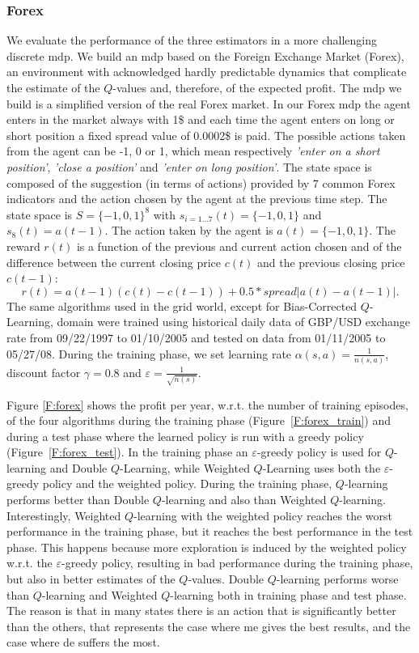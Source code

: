 \subsubsection{Forex}
We evaluate the performance of the three estimators in a more challenging discrete \gls{mdp}.
We build an \gls{mdp} based on the Foreign Exchange Market (Forex), an environment with acknowledged hardly predictable dynamics that complicate the estimate of the $Q$-values and, therefore, of the expected profit. The \gls{mdp} we build is a simplified version of the real Forex market. In our Forex \gls{mdp} the agent enters in the market always with 1\$ and each time the agent enters on long or short position a fixed spread value of 0.0002\$ is paid.
The possible actions taken from the agent can be -1, 0 or 1, which mean respectively \textit{'enter on a short position'}, \textit{'close a position'} and \textit{'enter on long position'}.
The state space is composed of the suggestion (in terms of actions) provided by 7 common Forex indicators and the action chosen by the agent at the previous time step.
The state space is $S = \lbrace -1, 0, 1 \rbrace ^8$ with $s_{i = 1...7}(t) = \lbrace -1, 0, 1 \rbrace$ and $s_8(t) = a(t - 1)$.
The action taken by the agent is $a(t) = \lbrace -1, 0, 1 \rbrace$.
The reward $r(t)$ is a function of the previous and current action chosen and of the difference between the current closing price $c(t)$ and the previous closing price $c(t - 1)$:
$$r(t) = a(t - 1)(c(t) - c(t - 1)) + 0.5 * spread |a(t) - a(t - 1)|.$$
The same algorithms used in the grid world, except for Bias-Corrected $Q$-Learning, domain were trained using historical daily data of GBP/USD exchange rate from 09/22/1997 to 01/10/2005 and tested on data from 01/11/2005 to 05/27/08. 
During the training phase, we set learning rate $\alpha(s,a)=\frac{1}{n(s, a)}$, discount factor $\gamma=0.8$ and $\varepsilon=\frac{1}{\sqrt{n(s)}}$.

Figure \ref{F:forex} shows the profit per year, w.r.t. the number of training episodes, of the four algorithms during the training phase (Figure~\ref{F:forex_train}) and during a test phase where the learned policy is run with a greedy policy (Figure~\ref{F:forex_test}). In the training phase an $\varepsilon$-greedy policy is used for $Q$-learning and Double $Q$-Learning, while Weighted $Q$-Learning uses both the $\varepsilon$-greedy policy and the weighted policy.
During the training phase, $Q$-learning performs better than Double $Q$-learning and also than Weighted $Q$-learning. Interestingly, Weighted $Q$-learning with the weighted policy reaches the worst performance in the training phase, but it reaches the best performance in the test phase. This happens because more exploration is induced by the weighted policy w.r.t. the $\varepsilon$-greedy policy, resulting in bad performance during the training phase, but also in better estimates of the $Q$-values.
Double $Q$-learning performs worse than $Q$-learning and Weighted $Q$-learning both in training phase and test phase. 
The reason is that in many states there is an action that is significantly better than the others, that represents the case where \gls{me} gives the best results, and the case where \gls{de} suffers the most.


